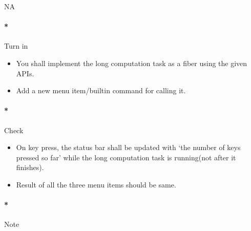 \documentclass[]{article}
\providecommand{\tightlist}{%
  \setlength{\itemsep}{0pt}\setlength{\parskip}{0pt}}
\let\oldparagraph\paragraph
\renewcommand{\paragraph}[1]{\oldparagraph{#1}\mbox{}}
\begin{document}
NA

\paragraph*{Turn in}\label{turn-in-5}

\begin{itemize}
\tightlist
\item
  You shall implement the long computation task as a fiber using the
  given APIs.
\item
  Add a new menu item/builtin command for calling it.
\end{itemize}

\paragraph*{Check}\label{check-5}

\begin{itemize}
\tightlist
\item
  On key press, the status bar shall be updated with `the number of keys
  pressed so far' while the long computation task is running(not after
  it finishes).
\item
  Result of all the three menu items should be same.
\end{itemize}

\paragraph*{Note}\label{note-7}
\end{document}

